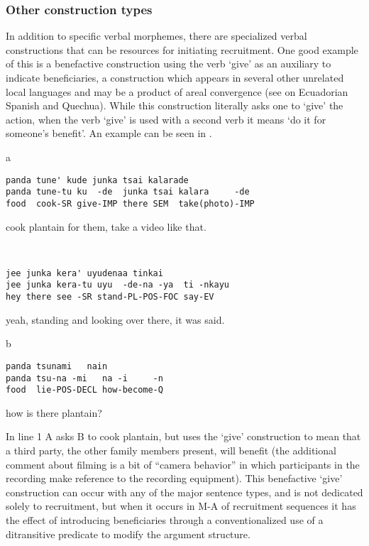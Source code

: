 \documentclass[output=paper]{langsci/langscibook}
\begin{document}
\subsubsection{Other construction types}\label{sec:floyd:3.3.5}

In addition to specific verbal morphemes, there are specialized verbal constructions that can be resources for initiating recruitment. One good example of this is a benefactive construction using the verb ‘give’ as an auxiliary to indicate beneficiaries, a construction which appears in several other unrelated local languages and may be a product of areal convergence (see \citealt{Bruil2008} on Ecuadorian Spanish and Quechua). While this construction literally asks one to ‘give’ the action, when the verb ‘give’ is used with a second verb it means ‘do it for someone’s benefit’. An example can be seen in .

\vspace{-1mm}
%
\begin{mdframednoverticalspace}[style=firstfoc]
\begin{transbox}{1}{a}
\begin{verbatim}
panda tune' kude junka tsai kalarade
panda tune-tu ku  -de  junka tsai kalara     -de
food  cook-SR give-IMP there SEM  take(photo)-IMP
\end{verbatim}
cook plantain for them, take a video like that.
\end{transbox}
\end{mdframednoverticalspace}
%
\begin{transbox}{2}{~}
\begin{verbatim}
jee junka kera' uyudenaa tinkai
jee junka kera-tu uyu  -de-na -ya  ti -nkayu
hey there see -SR stand-PL-POS-FOC say-EV
\end{verbatim}
yeah, standing and looking over there, it was said.
\end{transbox}
%
\begin{transbox}{3}{b}
\begin{verbatim}
panda tsunami   nain
panda tsu-na -mi   na -i     -n
food  lie-POS-DECL how-become-Q
\end{verbatim}
how is there plantain?
\end{transbox}\bigskip

In line 1 A asks B to cook plantain, but uses the ‘give’ construction to mean that a third party, the other family members present, will benefit (the additional comment about filming is a bit of “camera behavior” in which participants in the recording make reference to the recording equipment). This benefactive ‘give’ construction can occur with any of the major sentence types, and is not dedicated solely to recruitment, but when it occurs in M-A of recruitment sequences it has the effect of introducing beneficiaries through a conventionalized use of a ditransitive predicate to modify the argument structure.
\end{document}
